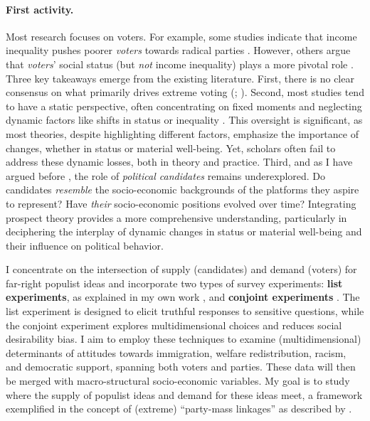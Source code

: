 \documentclass[letterpaper]{article}
\begin{document}
\paragraph{First activity.} Most research focuses on voters. For example, some studies indicate that income inequality pushes poorer \emph{voters} towards radical parties \parencite{Han2016b}. However, others argue that \emph{voters}' social status (but \emph{not} income inequality) plays a more pivotal role \parencite{Gidron2017a,Oesch2008a}. Three key takeaways emerge from the existing literature. First, there is no clear consensus on what primarily drives extreme voting (\cite[p. 3]{Ivarsflaten2008}; \cite[p. 279]{Jesuit2009}). Second, most studies tend to have a static perspective, often concentrating on fixed moments and neglecting dynamic factors like shifts in status or inequality \parencite{Kurer2019}. This oversight is significant, as most theories, despite highlighting different factors, emphasize the importance of changes, whether in status or material well-being. Yet, scholars often fail to address these dynamic losses, both in theory and practice. Third, and as I have argued before \parencite{Bahamonde2020a}, the role of \emph{political candidates} remains underexplored. Do candidates \emph{resemble} the socio-economic backgrounds of the platforms they aspire to represent? Have \emph{their} socio-economic positions evolved over time? Integrating prospect theory provides a more comprehensive understanding, particularly in deciphering the interplay of dynamic changes \parencite[643]{Thaler1990} in status or material well-being and their influence on political behavior.

\vspace{2mm}I concentrate on the intersection of supply (candidates) and demand (voters) for far-right populist ideas and incorporate two types of survey experiments: {\bf list experiments}, as explained in my own work \parencite{Bahamonde2020a}, and {\bf conjoint experiments} \parencite{Hainmueller2014}. The list experiment is designed to elicit truthful responses to sensitive questions, while the conjoint experiment explores multidimensional choices and reduces social desirability bias. I aim to employ these techniques to examine (multidimensional) determinants of attitudes towards immigration, welfare redistribution, racism, and democratic support, spanning both voters and parties. These data will then be merged with macro-structural socio-economic variables. My goal is to study where the supply of populist ideas and demand for these ideas meet, a framework exemplified in the concept of (extreme) ``party-mass linkages'' as described by \textcite{Kitschelt2000}. 
\end{document}
